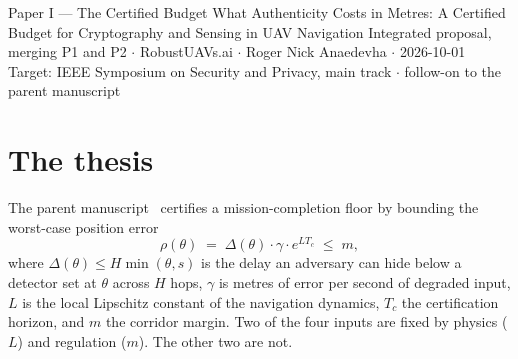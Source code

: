 \documentclass[11pt,a4paper]{article}
\begin{document}
\proposalheader
  {Paper I --- The Certified Budget}
  {What Authenticity Costs in Metres: A Certified Budget for Cryptography and
   Sensing in UAV Navigation}
  {Integrated proposal, merging P1 and P2 $\cdot$ RobustUAVs.ai $\cdot$
   Roger Nick Anaedevha $\cdot$ 2026-10-01\\
   Target: IEEE Symposium on Security and Privacy, main track $\cdot$
   follow-on to the parent manuscript~\cite{parentpaper}}

\begin{abstract}
\noindent
A robustness certificate for UAV navigation bounds the position error an
adversary can induce as the product of a delay it can hide, a rate at which that
delay becomes position error, and a dynamics factor. We observe that both of the
first two factors are security-engineering choices, and that a single operation
--- authentication --- moves them in opposite directions. Authenticating a
navigation source lets the estimator trust it, which lowers the error rate
$\gamma$; authenticating a message costs signing, verification and transmission
time, which raises the delay $\Delta$. The certificate is therefore a budget in
which cryptography and sensing trade, and it decides the net sign. We derive the
crossover condition under which authentication increases the certified mission
floor, show that tightening an intrusion detector makes authentication
\emph{more affordable but less beneficial}, and predict that the binding cost of
post-quantum signatures on a flight-controller bus is occupancy, a cliff, rather
than per-message latency, a slope. We propose to measure $\gamma$ for three
navigation sources and the authentication cost of five schemes on
flight-controller-class hardware, to map the crossover across transports, and to
show that an adversary who floods a bus with invalid signatures turns the defence
into the delay attack the certificate already bounds.
\end{abstract}

\section{The thesis}
The parent manuscript~\cite{parentpaper} certifies a mission-completion floor by
bounding the worst-case position error
\begin{equation}
\label{eq:rho}
\rho(\theta) \;=\; \Delta(\theta)\cdot\gamma\cdot e^{LT_c}\;\le\; m ,
\end{equation}
where $\Delta(\theta)\le H\min(\theta,s)$ is the delay an adversary can hide
below a detector set at $\theta$ across $H$ hops, $\gamma$ is metres of error per
second of degraded input, $L$ is the local Lipschitz constant of the navigation
dynamics, $T_c$ the certification horizon, and $m$ the corridor margin. Two of
the four inputs are fixed by physics ($L$) and regulation ($m$). The other two
are not.
\end{document}
